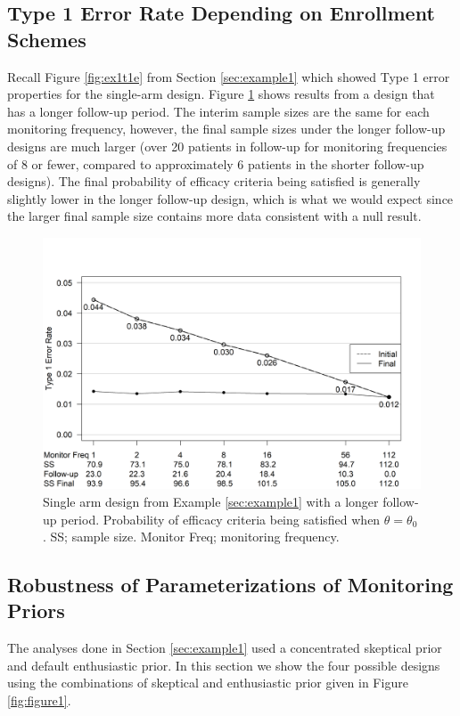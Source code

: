 \documentclass[useAMS,usenatbib,referee]{biom}
\begin{document}
\subsection{Type 1 Error Rate Depending on Enrollment Schemes}
Recall Figure \ref{fig:ex1t1e} from Section \ref{sec:example1} which showed Type 1 error properties for the single-arm design. Figure \ref{fig:ex1t1e_longer} shows results from a design that has a longer follow-up period. The interim sample sizes are the same for each monitoring frequency, however, the final sample sizes under the longer follow-up designs are much larger (over 20 patients in follow-up for monitoring frequencies of 8 or fewer, compared to approximately 6 patients in the shorter follow-up designs). The final probability of efficacy criteria being satisfied is generally slightly lower in the longer follow-up design, which is what we would expect since the larger final sample size contains more data consistent with a null result.
\begin{figure}\begin{center}

   \includegraphics[width=6in]{figureS1.png}
    \caption{Single arm design from Example \ref{sec:example1} with a longer follow-up period. Probability of efficacy criteria being satisfied when $\theta=\theta_0$. SS; sample size. Monitor Freq; monitoring frequency.}
	\label{fig:ex1t1e_longer}

\end{center}
\end{figure}
\subsection{Robustness of Parameterizations of Monitoring Priors}\label{sec:priorRobustness}
The analyses done in Section \ref{sec:example1} used a concentrated skeptical prior and default enthusiastic prior. In this section we show the four possible designs using the combinations of skeptical and enthusiastic prior given in Figure \ref{fig:figure1}.
\end{document}
